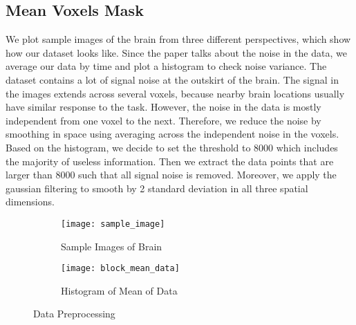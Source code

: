 \subsection{Mean Voxels Mask}

We plot sample images of the brain from three different perspectives, which 
show how our dataset looks like. Since the paper talks about the noise 
in the data, we average our data by time and plot a histogram to check noise 
variance. The dataset contains a lot of signal noise at the outskirt of the 
brain. The signal in the images extends across several voxels, because nearby 
brain locations usually have similar response to the task. However, the noise 
in the data is mostly independent from one voxel to the next. Therefore, we 
reduce the noise by smoothing in space using averaging across the independent 
noise in the voxels. Based on the histogram, we decide to set the threshold to 
8000 which includes the majority of useless information. Then we extract the data 
points that are larger than 8000 such that all signal noise is removed. Moreover, 
we apply the gaussian filtering to smooth by 2 standard deviation in all three 
spatial dimensions.

\begin{figure}[!h]
\centering
\begin{subfigure}{.45\textwidth}
  \texttt{[image: sample\_image]}
  \caption{Sample Images of Brain}
  \label{fig:sub1}
\end{subfigure}%
\begin{subfigure}{.6\textwidth}
  \texttt{[image: block\_mean\_data]}
  \centering
  \caption{Histogram of Mean of Data}
  \label{fig:sub2}
\end{subfigure}
\caption{Data Preprocessing\label{fig:datapre}}
\end{figure}



